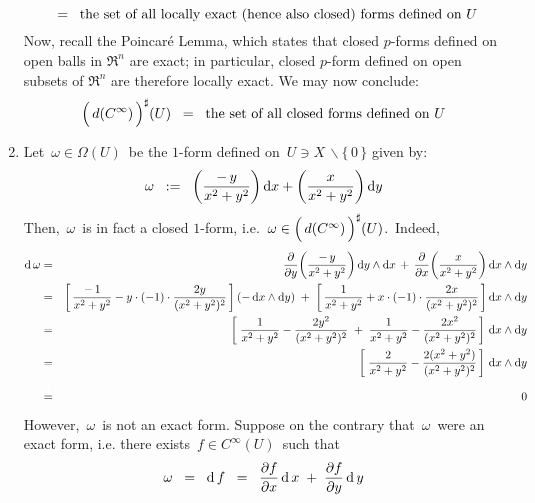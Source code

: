 \begin{enumerate}
\begin{equation*}
	\;\; = \;\;
		\textnormal{the set of all locally exact (hence also closed) forms defined on $U$}
	\end{equation*}	
	Now, recall the Poincar\'{e} Lemma, which states that
	closed $p$-forms defined on open balls in $\Re^{n}$ are exact;
	in particular, closed $p$-form defined on open subsets of $\Re^{n}$ are therefore locally exact.
	We may now conclude:
	\begin{equation*}
	\left(\,\overset{{\color{white}.}}{d(C^{\infty})}\,\right)^{\sharp}\!(U)
	\;\; = \;\;
		\textnormal{the set of all closed forms defined on $U$}
	\end{equation*}	
\item
	Let \,$\omega \in \Omega(U)$\, be the $1$-form defined on \,$U \ni X \,\backslash \{\,0\,\}$ given by:
	\begin{equation*}
	\omega \;\; := \;\; \left(\dfrac{-\,y}{x^{2}+y^{2}}\right)\textnormal{d} x + \left(\dfrac{x}{x^{2}+y^{2}}\right)\textnormal{d} y
	\end{equation*}
	Then, \,$\omega$\, is in fact a closed $1$-form, i.e.
	 \,$\omega \in \left(\,\overset{{\color{white}.}}{d(C^{\infty})}\,\right)^{\sharp}\!(U)$.\,
	 Indeed,
	\begin{eqnarray*}
	\d\,\omega
	& = &
		\dfrac{\partial}{\partial y}\!\left(\dfrac{-\,y}{x^{2}+y^{2}}\right)\d y \wedge \d x
		\, + \,
		\dfrac{\partial}{\partial x}\!\left(\dfrac{x}{x^{2}+y^{2}}\right)\d x \wedge \d y
	\\
	& = &
		\left[\,\dfrac{-\,1}{x^{2}+y^{2}} - y\cdot(-1)\cdot\dfrac{2y}{(x^{2}+y^{2})^2}\,\right]\left(- \,\d x \wedge \d y\right)
		\; + \;
		\left[\,\dfrac{1}{x^{2}+y^{2}} + x\cdot(-1)\cdot\dfrac{2x}{(x^{2}+y^{2})^2}\,\right]\d x \wedge \d y
	\\
	& = &
		\left[\;
			\dfrac{1}{x^{2}+y^{2}} - \dfrac{2y^{2}}{(x^{2}+y^{2})^2}
			\; + \;
			\dfrac{1}{x^{2}+y^{2}} - \dfrac{2x^{2}}{(x^{2}+y^{2})^2}
			\,\right]\,\d x \wedge \d y
	\\
	& = &
		\left[\;
			\dfrac{2}{x^{2}+y^{2}} - \dfrac{2(x^{2}+y^{2})}{(x^{2}+y^{2})^2}
			\,\right]\,\d x \wedge \d y
	\\
	& \overset{{\color{white}\textnormal{\Large$1$}}}{=} &
		0
	\end{eqnarray*}
	However, \,$\omega$\, is not an exact form.
	Suppose on the contrary that \,$\omega$\, were an exact form, i.e.
	there exists \,$f \in C^{\infty}(U)$\, such that
	\begin{equation*}
	\omega
	\;\; = \;\;
		\d\,f
	\;\; = \;\;
		\dfrac{\partial f}{\partial x}\,\d\,x \; + \; \dfrac{\partial f}{\partial y}\,\d\,y

\end{equation*}
\end{enumerate}
